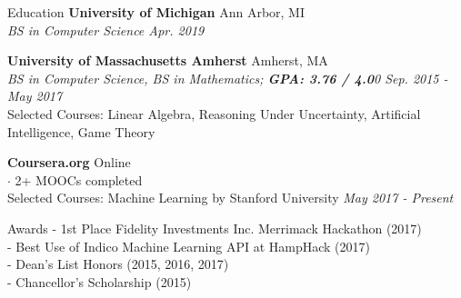 \documentclass{resume} %
\begin{document}
	
	

	\begin{rSection}{Education}
		{\bf University of Michigan} \hfill {Ann Arbor, MI} \\ 
		\textit{BS in Computer Science \hfill {Apr. 2019}}
		
		{\bf University of Massachusetts Amherst} \hfill {Amherst, MA} \\ 
		\textit{BS in Computer Science, BS in Mathematics; \textbf{GPA: 3.76 / 4.0}0 \hfill {Sep. 2015 - May 2017} }\\
		Selected Courses: Linear Algebra, Reasoning Under Uncertainty, Artificial Intelligence, Game Theory
		
		\textbf{Coursera.org} \hfill {Online} \\ 
		$\cdot$ 2+ MOOCs completed \\
		Selected Courses: Machine Learning by Stanford University \hfill {\textit{May 2017 - Present}}
	\end{rSection}
	
	
	\begin{rSection}{Awards}
		- 1st Place Fidelity Investments Inc. Merrimack Hackathon (2017) \\
		- Best Use of Indico Machine Learning API at HampHack (2017) \\
		- Dean's List Honors (2015, 2016, 2017) \\
		- Chancellor's Scholarship (2015)
	\end{rSection}

	
\end{document}
